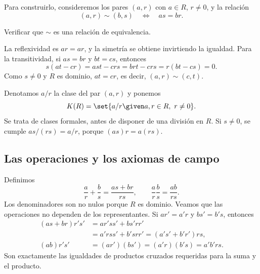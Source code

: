 Para construirlo, consideremos los pares $(a,r)$ con $a\in R$, $r\ne0$, y la relación
\[
(a,r)\sim(b,s)\quad\Longleftrightarrow\quad as=br.
\]
\begin{ejer}\label{ejer:C18-equivalencia}
Verificar que $\sim$ es una relación de equivalencia.
\end{ejer}
\begin{sol}
La reflexividad es $ar=ar$, y la simetría se obtiene invirtiendo la igualdad. Para la transitividad, si $as=br$ y $bt=cs$, entonces
\[
s(at-cr)=ast-crs=brt-crs=r(bt-cs)=0.
\]
Como $s\ne0$ y $R$ es dominio, $at=cr$, es decir, $(a,r)\sim(c,t)$.
\end{sol}
Denotamos $a/r$ la clase del par $(a,r)$ y ponemos
\[
K(R)=\set{a/r\given a,r\in R,\ r\ne0}.
\]
Se trata de clases formales, antes de disponer de una división en $R$. Si $s\ne0$, se cumple $as/(rs)=a/r$, porque $(as)r=a(rs)$.

\subsection{Las operaciones y los axiomas de campo}
Definimos
\[
\frac ar+\frac bs=\frac{as+br}{rs},\qquad
\frac ar\frac bs=\frac{ab}{rs}.
\]
Los denominadores son no nulos porque $R$ es dominio. Veamos que las operaciones no dependen de los representantes. Si $ar'=a'r$ y $bs'=b's$, entonces
\[
\begin{aligned}
(as+br)r's'
&=ar'ss'+bs'rr'\\
&=a'rss'+b'srr'=(a's'+b'r')rs,\\
(ab)r's'&=(ar')(bs')=(a'r)(b's)=a'b'rs.
\end{aligned}
\]
Son exactamente las igualdades de productos cruzados requeridas para la suma y el producto.

